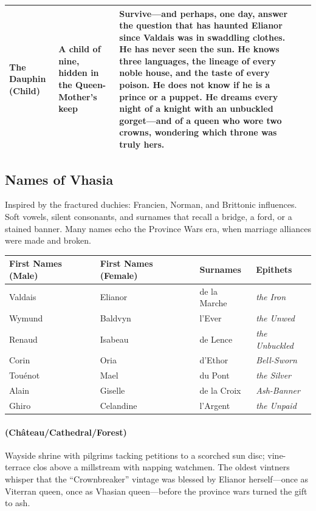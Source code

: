 \begin{longtable}{|p{}|p{}|p{}|p{}|}
\hline
The Dauphin (Child) & A child of nine, hidden in the Queen-Mother's keep & Survive---and perhaps, one day, answer the question that has haunted Elianor since Valdais was in swaddling clothes. He has never seen the sun. He knows three languages, the lineage of every noble house, and the taste of every poison. He does not know if he is a prince or a puppet. He dreams every night of a knight with an unbuckled gorget---and of a queen who wore two crowns, wondering which throne was truly hers. \\
\hline
\end{longtable}

\subsection*{Names of Vhasia}
\label{sec:vhasia-names}

Inspired by the fractured duchies: Francien, Norman, and Brittonic influences. Soft vowels, silent consonants, and surnames that recall a bridge, a ford, or a stained banner. Many names echo the Province Wars era, when marriage alliances were made and broken.

\begin{longtable}{|p{}|p{}|p{}|p{}|}
\hline
\textbf{First Names (Male)} & \textbf{First Names (Female)} & \textbf{Surnames} & \textbf{Epithets} \\
\hline
Valdais & Elianor & de la Marche & \textit{the Iron} \\
\hline
Wymund & Baldvyn & l'Ever & \textit{the Unwed} \\
\hline
Renaud & Isabeau & de Lence & \textit{the Unbuckled} \\
\hline
Corin & Oria & d'Ethor & \textit{Bell-Sworn} \\
\hline
Touénot & Mael & du Pont & \textit{the Silver} \\
\hline
Alain & Giselle & de la Croix & \textit{Ash-Banner} \\
\hline
Ghiro & Celandine & l'Argent & \textit{the Unpaid} \\
\hline
\end{longtable}

\paragraph*{(Château/Cathedral/Forest)} Wayside shrine with pilgrims tacking petitions to a scorched sun disc; vine-terrace clos above a millstream with napping watchmen. The oldest vintners whisper that the ``Crownbreaker'' vintage was blessed by Elianor herself---once as Viterran queen, once as Vhasian queen---before the province wars turned the gift to ash.

